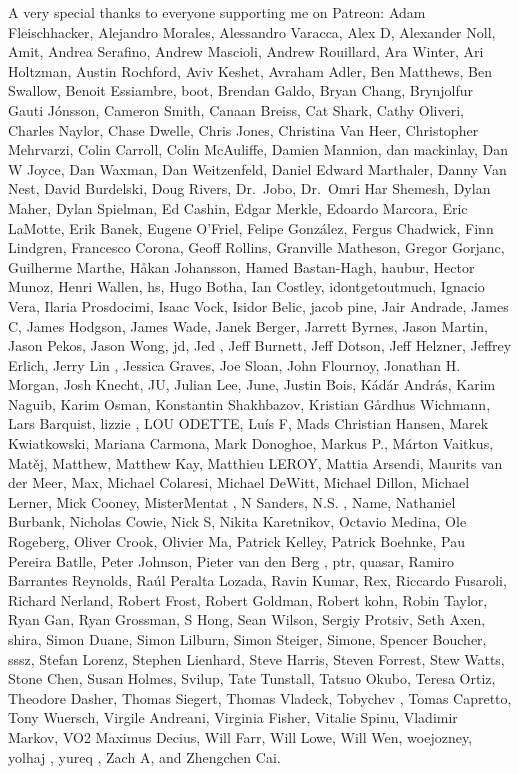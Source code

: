 \documentclass[
  letterpaper,
  DIV=11,
  numbers=noendperiod]{scrartcl}
\begin{document}
A very special thanks to everyone supporting me on Patreon: Adam
Fleischhacker, Alejandro Morales, Alessandro Varacca, Alex D, Alexander
Noll, Amit, Andrea Serafino, Andrew Mascioli, Andrew Rouillard, Ara
Winter, Ari Holtzman, Austin Rochford, Aviv Keshet, Avraham Adler, Ben
Matthews, Ben Swallow, Benoit Essiambre, boot, Brendan Galdo, Bryan
Chang, Brynjolfur Gauti Jónsson, Cameron Smith, Canaan Breiss, Cat
Shark, Cathy Oliveri, Charles Naylor, Chase Dwelle, Chris Jones,
Christina Van Heer, Christopher Mehrvarzi, Colin Carroll, Colin
McAuliffe, Damien Mannion, dan mackinlay, Dan W Joyce, Dan Waxman, Dan
Weitzenfeld, Daniel Edward Marthaler, Danny Van Nest, David Burdelski,
Doug Rivers, Dr.~Jobo, Dr.~Omri Har Shemesh, Dylan Maher, Dylan
Spielman, Ed Cashin, Edgar Merkle, Edoardo Marcora, Eric LaMotte, Erik
Banek, Eugene O'Friel, Felipe González, Fergus Chadwick, Finn Lindgren,
Francesco Corona, Geoff Rollins, Granville Matheson, Gregor Gorjanc,
Guilherme Marthe, Håkan Johansson, Hamed Bastan-Hagh, haubur, Hector
Munoz, Henri Wallen, hs, Hugo Botha, Ian Costley, idontgetoutmuch,
Ignacio Vera, Ilaria Prosdocimi, Isaac Vock, Isidor Belic, jacob pine,
Jair Andrade, James C, James Hodgson, James Wade, Janek Berger, Jarrett
Byrnes, Jason Martin, Jason Pekos, Jason Wong, jd, Jed , Jeff Burnett,
Jeff Dotson, Jeff Helzner, Jeffrey Erlich, Jerry Lin , Jessica Graves,
Joe Sloan, John Flournoy, Jonathan H. Morgan, Josh Knecht, JU, Julian
Lee, June, Justin Bois, Kádár András, Karim Naguib, Karim Osman,
Konstantin Shakhbazov, Kristian Gårdhus Wichmann, Lars Barquist, lizzie
, LOU ODETTE, Luís F, Mads Christian Hansen, Marek Kwiatkowski, Mariana
Carmona, Mark Donoghoe, Markus P., Márton Vaitkus, Matěj, Matthew,
Matthew Kay, Matthieu LEROY, Mattia Arsendi, Maurits van der Meer, Max,
Michael Colaresi, Michael DeWitt, Michael Dillon, Michael Lerner, Mick
Cooney, MisterMentat , N Sanders, N.S. , Name, Nathaniel Burbank,
Nicholas Cowie, Nick S, Nikita Karetnikov, Octavio Medina, Ole Rogeberg,
Oliver Crook, Olivier Ma, Patrick Kelley, Patrick Boehnke, Pau Pereira
Batlle, Peter Johnson, Pieter van den Berg , ptr, quasar, Ramiro
Barrantes Reynolds, Raúl Peralta Lozada, Ravin Kumar, Rex, Riccardo
Fusaroli, Richard Nerland, Robert Frost, Robert Goldman, Robert kohn,
Robin Taylor, Ryan Gan, Ryan Grossman, S Hong, Sean Wilson, Sergiy
Protsiv, Seth Axen, shira, Simon Duane, Simon Lilburn, Simon Steiger,
Simone, Spencer Boucher, sssz, Stefan Lorenz, Stephen Lienhard, Steve
Harris, Steven Forrest, Stew Watts, Stone Chen, Susan Holmes, Svilup,
Tate Tunstall, Tatsuo Okubo, Teresa Ortiz, Theodore Dasher, Thomas
Siegert, Thomas Vladeck, Tobychev , Tomas Capretto, Tony Wuersch,
Virgile Andreani, Virginia Fisher, Vitalie Spinu, Vladimir Markov, VO2
Maximus Decius, Will Farr, Will Lowe, Will Wen, woejozney, yolhaj ,
yureq , Zach A, and Zhengchen Cai.
\end{document}
